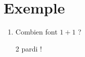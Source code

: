 \section{Exemple}

\begin{enumerate}
  \item
    Combien font $1+1$ ?
    \begin{solution}
      2 pardi !
    \end{solution}
\end{enumerate}
